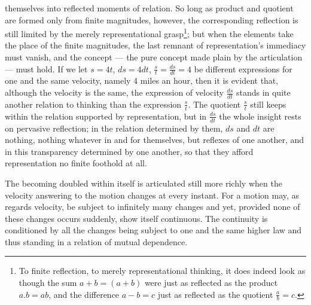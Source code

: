 \documentclass[12pt,a4paper]{book}
\begin{document}
themselves into reflected moments of relation. So long as product and quotient
are formed only from finite magnitudes, however, the corresponding reflection
is still limited by the merely representational grasp\footnote{To finite
reflection, to merely representational thinking, it does indeed look as though
the sum $a + b = (a + b)$ were just as reflected as the product $a.b = ab$, and
the difference $a - b = c$ just as reflected as the quotient
$\frac{a}{b} = c$.}; but when the elements take the place of the finite
magnitudes, the last remnant of representation's immediacy must vanish, and the
concept --- the pure concept made plain by the articulation --- must hold. If
we let $s = 4t$, $ds = 4dt$, $\frac{s}{t} = \frac{ds}{dt} = 4$ be different
expressions for one and the same velocity, namely 4 miles an hour, then it is
evident that, although the velocity is the same, the expression of velocity
$\frac{ds}{dt}$ stands in quite another relation to thinking than the
expression $\frac{s}{t}$. The quotient $\frac{s}{t}$ still keeps within the
relation supported by representation, but in $\frac{ds}{dt}$ the whole insight
rests on pervasive reflection; in the relation determined by them, $ds$ and
$dt$ are nothing, nothing whatever in and for themselves, but reflexes of one
another,
and in this transparency determined by one another, so that they afford
representation no finite foothold at all.

The becoming doubled within itself is articulated still more richly when the
velocity answering to the motion changes at every instant. For a motion may, as
regards velocity, be subject to infinitely many changes and yet, provided none
of these changes occurs suddenly, show itself continuous. The continuity is
conditioned by all the changes being subject to one and the same higher law and
thus standing in a relation of mutual dependence.
\end{document}
